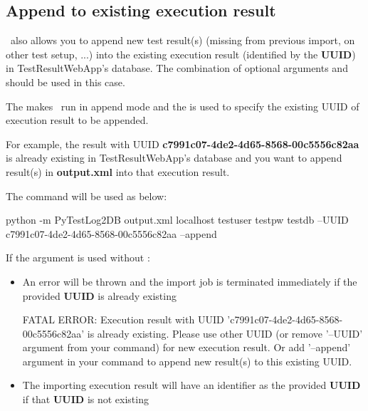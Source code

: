   \hypertarget{append-to-existing-execution-result}{%
  \subsection{Append to existing execution result}
  \label{append-to-existing-execution-result}}
    \pkg\ also allows you to append new test result(s) (missing from previous 
    import, on other test setup, ...) into the existing execution result 
    (identified by the \textbf{UUID}) in TestResultWebApp's database. 
    The combination of optional arguments  and 
     should be used in this case.

    The  makes \pkg\ run in append mode and the  
    is used to specify the existing UUID of execution result to be appended.

    For example, the result with UUID \textbf{c7991c07-4de2-4d65-8568-00c5556c82aa} 
    is already existing in TestResultWebApp's database and you want to append
    result(s) in \textbf{output.xml} into that execution result.

    The command will be used as below:
\begin{robotlog}
python -m PyTestLog2DB output.xml localhost testuser testpw testdb --UUID c7991c07-4de2-4d65-8568-00c5556c82aa --append
\end{robotlog}

    If the argument  is used without :
    \begin{itemize}
      \item An error will be thrown and the import job is terminated immediately
            if the provided \textbf{UUID} is already existing

\begin{robotlog}
FATAL ERROR: Execution result with UUID 'c7991c07-4de2-4d65-8568-00c5556c82aa' is already existing.
             Please use other UUID (or remove '--UUID' argument from your command) for new execution result.
             Or add '--append' argument in your command to append new result(s) to this existing UUID.
\end{robotlog}
      \item The importing execution result will have an identifier as the 
            provided \textbf{UUID} if that \textbf{UUID} is not existing
    \end{itemize}
    
